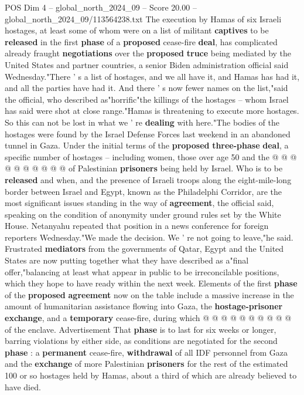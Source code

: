 \begin{textsample}{POS Dim 4 – global\_north\_2024\_09 – Score 20.00 – global\_north\_2024\_09/113564238.txt}  \label{ex:f4_pos_327}
The execution by Hamas of six Israeli hostages, at least some of whom were on a list of militant \textbf{captives} to be \textbf{released} in the first \textbf{phase} of a \textbf{proposed} cease-fire \textbf{deal}, has complicated already fraught \textbf{negotiations} over the \textbf{proposed} \textbf{truce} being mediated by the United States and partner countries, a senior Biden administration official said Wednesday."There ' s a list of hostages, and we all have it, and Hamas has had it, and all the parties have had it.
And there ' s now fewer names on the list,"said the official, who described as"horrific"the killings of the hostages -- whom Israel has said were shot at close range."Hamas is threatening to execute more hostages.
So this can not be lost in what we ' re \textbf{dealing} with here."The bodies of the hostages were found by the Israel Defense Forces last weekend in an abandoned tunnel in Gaza.
Under the initial terms of the \textbf{proposed} \textbf{three-phase} \textbf{deal}, a specific number of hostages -- including women, those over age 50 and the @ @ @ @ @ @ @ @ @ @ of Palestinian \textbf{prisoners} being held by Israel.
Who is to be \textbf{released} and when, and the presence of Israeli troops along the eight-mile-long border between Israel and Egypt, known as the Philadelphi Corridor, are the most significant issues standing in the way of \textbf{agreement}, the official said, speaking on the condition of anonymity under ground rules set by the White House.
Netanyahu repeated that position in a news conference for foreign reporters Wednesday."We made the decision.
We ' re not going to leave,"he said.
Frustrated \textbf{mediators} from the governments of Qatar, Egypt and the United States are now putting together what they have described as a"final offer,"balancing at least what appear in public to be irreconcilable positions, which they hope to have ready within the next week.
Elements of the first \textbf{phase} of the \textbf{proposed} \textbf{agreement} now on the table include a massive increase in the amount of humanitarian assistance flowing into Gaza, the \textbf{hostage-prisoner} \textbf{exchange}, and a \textbf{temporary} cease-fire, during which @ @ @ @ @ @ @ @ @ @ of the enclave.
Advertisement That \textbf{phase} is to last for six weeks or longer, barring violations by either side, as conditions are negotiated for the second \textbf{phase} : a \textbf{permanent} cease-fire, \textbf{withdrawal} of all IDF personnel from Gaza and the \textbf{exchange} of more Palestinian \textbf{prisoners} for the rest of the estimated 100 or so hostages held by Hamas, about a third of which are already believed to have died.

\end{textsample}
